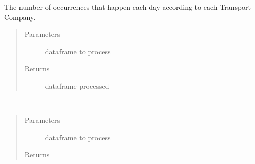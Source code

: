\documentclass[letterpaper,10pt,english]{sphinxmanual}
\begin{document}
\begin{fulllineitems}
\label{\detokenize{algorithms:algorithms.idp.idp.occurrences_day_transporter}}
\sphinxAtStartPar
The number of occurrences that happen each day according to each Transport Company.
\begin{quote}\begin{description}
\item[{Parameters}] \leavevmode
\sphinxAtStartPar
{} \textendash{} dataframe to process

\item[{Returns}] \leavevmode
\sphinxAtStartPar
dataframe processed

\end{description}\end{quote}

\end{fulllineitems}


\begin{fulllineitems}
\label{\detokenize{algorithms:algorithms.idp.idp.occurrences_weekday_transporter}}~\begin{quote}\begin{description}
\item[{Parameters}] \leavevmode
\sphinxAtStartPar
{} \textendash{} dataframe to process

\item[{Returns}] \leavevmode
\sphinxAtStartPar


\end{description}\end{quote}

\end{fulllineitems}

\end{document}
